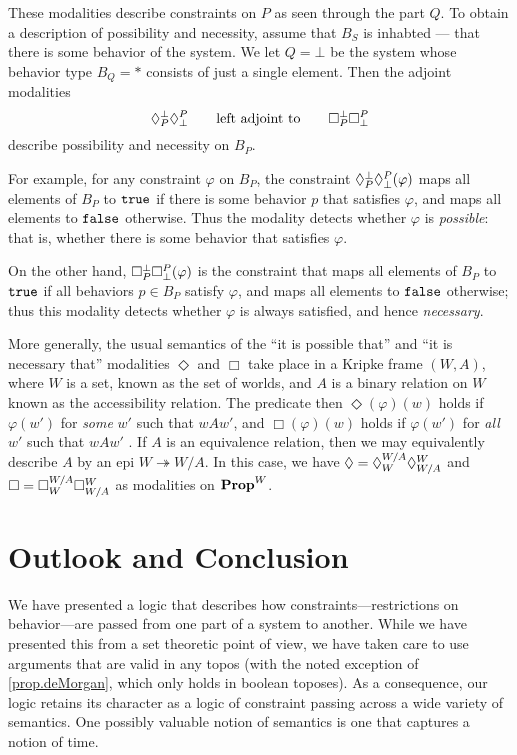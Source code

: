 These modalities describe constraints on $P$ as seen through the part $Q$. To
obtain a description of possibility and necessity, assume that $B_S$ is inhabted
--- that there is some behavior of the system. We let $Q=\bot$ be the system whose behavior type $B_Q=\ast$ consists of just a single element. Then the adjoint modalities
$$\allows{\bot}{P}\allows{P}{\bot} \qquad \textrm{left adjoint to} \qquad \ensure{\bot}{P}\ensure{P}{\bot}$$
describe possibility and necessity on $B_P$. 

For example, for any constraint $\varphi$ on $B_P$, the constraint $\allows{\bot}{P}\allows{P}{\bot}(\varphi)$ maps all elements of $B_P$ to $\true$ if there is some behavior $p$ that satisfies $\varphi$, and maps all elements to $\false$ otherwise. Thus the modality detects whether $\varphi$ is \emph{possible}: that is, whether there is some behavior that satisfies $\varphi$. 

On the other hand, $\ensure{\bot}{P}\ensure{P}{\bot}(\varphi)$ is the constraint that maps all elements of $B_P$ to $\true$ if all behaviors $p \in B_P$ satisfy $\varphi$, and maps all elements to $\false$ otherwise; thus this modality detects whether $\varphi$ is always satisfied, and hence \emph{necessary}.

More generally, the usual semantics of the ``it is possible that'' and ``it is necessary that'' modalities $\Diamond$ and $\Box$ take place in a Kripke frame $(W,A)$, where $W$ is a set, known as the set of worlds, and $A$ is a binary relation on $W$ known as the accessibility relation. The predicate then $\Diamond(\varphi)(w)$ holds if $\varphi(w')$ for \emph{some} $w'$ such that $wAw'$, and $\Box(\varphi)(w)$ holds if $\varphi(w')$ for \emph{all} $w'$ such that $wAw'$ \cite{kripke1963semantical}. If $A$ is an equivalence relation, then we may equivalently describe $A$ by an epi $W \twoheadrightarrow W/A$. In this case, we have $\Diamond=\allows{W/A}{W}\allows{W}{W/A}$ and $\Box= \ensure{W/A}{W}\ensure{W}{W/A}$ as modalities on $\Prop^W$. 

\section{Outlook and Conclusion}
We have presented a logic that describes how constraints---restrictions on behavior---are passed from one part of a system to another. While we have presented this from a set theoretic point of view, we have taken care to use arguments that are valid in any topos (with the noted exception of \cref{prop.deMorgan}, which only holds in boolean toposes). As a consequence, our logic retains its character as a logic of constraint passing across a wide variety of semantics. One possibly valuable notion of semantics is one that captures a notion of time.

